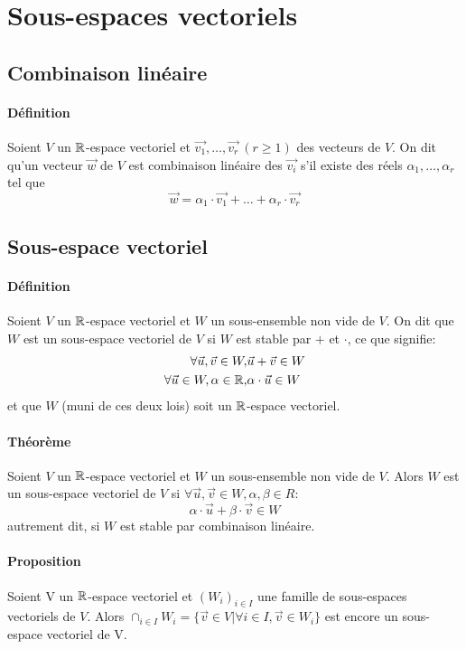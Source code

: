%
%
\section{Sous-espaces vectoriels}
%
%

%
\subsection{Combinaison linéaire}
%
\paragraph{Définition} Soient $V$ un $\mathbb{R}$-espace vectoriel et $\vec{v_1}, \ldots, \vec{v_r} ~ (r\geq 1)$ des vecteurs de $V$. On dit qu'un vecteur $\vec{w}$ de $V$ est combinaison linéaire des $\vec{v_i}$ s'il existe des réels $\alpha_1, \ldots, \alpha_r$ tel que
$$\vec{w} = \alpha_1 \cdot \vec{v_1} + \ldots + \alpha_r \cdot \vec{v_r}$$

%
\subsection{Sous-espace vectoriel}
%
\paragraph{Définition} Soient $V$ un $\mathbb{R}$-espace vectoriel et $W$ un sous-ensemble non vide de $V$. On dit que $W$ est un sous-espace vectoriel de $V$ si $W$ est stable par $+$ et $\cdot$, ce que signifie:
\begin{eqnarray*}
  \forall \vec{u}, \vec{v} \in W, & \vec{u} + \vec{v} \in W \\
  \forall \vec{u} \in W, \alpha \in \mathbb{R}, & \alpha \cdot \vec{u} \in W \\
\end{eqnarray*}
et que $W$ (muni de ces deux lois) soit un $\mathbb{R}$-espace vectoriel.

\paragraph{Théorème} Soient $V$ un $\mathbb{R}$-espace vectoriel et $W$ un sous-ensemble non vide de $V$. Alors $W$ est un sous-espace vectoriel de $V$ si $\forall \vec{u}, \vec{v} \in W, \alpha, \beta \in R$:
$$\alpha \cdot \vec{u} + \beta \cdot \vec{v} \in W$$
autrement dit, si $W$ est stable par combinaison linéaire.

\paragraph{Proposition} Soient V un $\mathbb{R}$-espace vectoriel et $(W_i)_{i \in I}$ une famille de sous-espaces vectoriels de $V$. Alors $\cap_{i \in I} W_i = \{ \vec{v} \in V | \forall i \in I, \vec{v} \in W_i\}$ est encore un sous-espace vectoriel de V.

